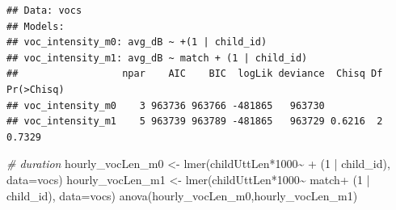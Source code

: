 \documentclass[
]{article}
\newenvironment{Shaded}{\begin{snugshade}}{\end{snugshade}}
\newcommand{\AttributeTok}[1]{\textcolor[rgb]{0.77,0.63,0.00}{#1}}
\newcommand{\CommentTok}[1]{\textcolor[rgb]{0.56,0.35,0.01}{\textit{#1}}}
\newcommand{\DecValTok}[1]{\textcolor[rgb]{0.00,0.00,0.81}{#1}}
\newcommand{\FunctionTok}[1]{\textcolor[rgb]{0.00,0.00,0.00}{#1}}
\newcommand{\NormalTok}[1]{#1}
\newcommand{\OtherTok}[1]{\textcolor[rgb]{0.56,0.35,0.01}{#1}}
\newcommand{\SpecialCharTok}[1]{\textcolor[rgb]{0.00,0.00,0.00}{#1}}
\newcommand{\StringTok}[1]{\textcolor[rgb]{0.31,0.60,0.02}{#1}}
\begin{document}
\begin{Shaded}
\end{Shaded}

\begin{verbatim}
## Data: vocs
## Models:
## voc_intensity_m0: avg_dB ~ +(1 | child_id)
## voc_intensity_m1: avg_dB ~ match + (1 | child_id)
##                  npar    AIC    BIC  logLik deviance  Chisq Df Pr(>Chisq)
## voc_intensity_m0    3 963736 963766 -481865   963730                     
## voc_intensity_m1    5 963739 963789 -481865   963729 0.6216  2     0.7329
\end{verbatim}

\begin{Shaded}
\begin{Highlighting}[]
\CommentTok{\# duration}
\NormalTok{hourly\_vocLen\_m0 }\OtherTok{\textless{}{-}} \FunctionTok{lmer}\NormalTok{(childUttLen}\SpecialCharTok{*}\DecValTok{1000}\SpecialCharTok{\textasciitilde{}} \SpecialCharTok{+}\NormalTok{ (}\DecValTok{1} \SpecialCharTok{|}\NormalTok{ child\_id), }\AttributeTok{data=}\NormalTok{vocs)}
\NormalTok{hourly\_vocLen\_m1 }\OtherTok{\textless{}{-}} \FunctionTok{lmer}\NormalTok{(childUttLen}\SpecialCharTok{*}\DecValTok{1000}\SpecialCharTok{\textasciitilde{}}\NormalTok{ match}\SpecialCharTok{+}\NormalTok{ (}\DecValTok{1} \SpecialCharTok{|}\NormalTok{ child\_id), }\AttributeTok{data=}\NormalTok{vocs)}
\FunctionTok{anova}\NormalTok{(hourly\_vocLen\_m0,hourly\_vocLen\_m1)}
\end{Highlighting}
\end{Shaded}
\end{document}
